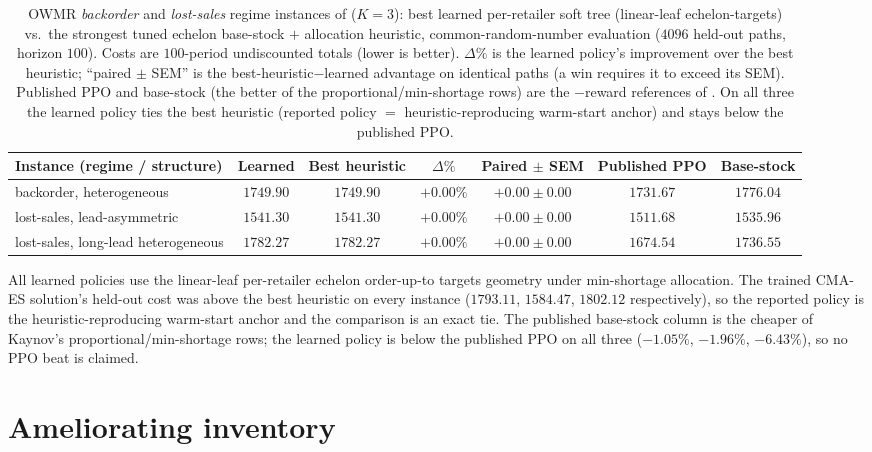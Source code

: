 \documentclass[11pt]{article}
\begin{document}
\begin{table}[!htbp]
\centering
\small
\caption{OWMR \emph{backorder} and \emph{lost-sales} regime instances of
\citet{kaynov2024owmr} ($K{=}3$): best learned per-retailer soft tree (linear-leaf
echelon-targets) vs.\ the strongest tuned echelon base-stock $+$ allocation heuristic,
common-random-number evaluation ($4096$ held-out paths, horizon $100$). Costs are
$100$-period undiscounted totals (lower is better). $\Delta\%$ is the learned policy's
improvement over the best heuristic; ``paired $\pm$ SEM'' is the best-heuristic$-$learned advantage on identical
paths (a win requires it to exceed its SEM). Published PPO and base-stock (the better of the
proportional/min-shortage rows) are the $-$reward references of \citet{kaynov2024owmr}. On all
three the learned policy ties the best heuristic (reported policy $=$ heuristic-reproducing warm-start
anchor) and stays below the published PPO.}
\label{tab:owmr-results-regimes}
\begin{tabular}{lcccccc}
\toprule
Instance (regime / structure) & Learned & Best heuristic & $\Delta\%$ & Paired $\pm$ SEM & Published PPO & Base-stock \\
\midrule
backorder, heterogeneous           & $1749.90$ & $1749.90$ & $+0.00\%$ & $+0.00\pm0.00$ & $1731.67$ & $1776.04$ \\
lost-sales, lead-asymmetric        & $1541.30$ & $1541.30$ & $+0.00\%$ & $+0.00\pm0.00$ & $1511.68$ & $1535.96$ \\
lost-sales, long-lead heterogeneous & $1782.27$ & $1782.27$ & $+0.00\%$ & $+0.00\pm0.00$ & $1674.54$ & $1736.55$ \\
\bottomrule
\end{tabular}
\par\medskip\footnotesize All learned policies use the linear-leaf per-retailer
echelon order-up-to targets geometry under min-shortage allocation. The trained CMA-ES
solution's held-out cost was above the best heuristic on every instance ($1793.11$, $1584.47$,
$1802.12$ respectively), so the reported policy is the heuristic-reproducing warm-start anchor and
the comparison is an exact tie. The published base-stock column is the cheaper of Kaynov's
proportional/min-shortage rows; the learned policy is below the published PPO on all three
($-1.05\%$, $-1.96\%$, $-6.43\%$), so no PPO beat is claimed.
\end{table}
\FloatBarrier

\section{Ameliorating inventory}
\label{sec:amelior}
\end{document}
